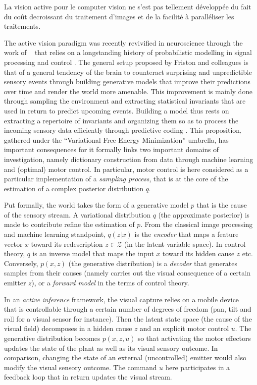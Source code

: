 \documentclass[12pt,twoside,openright]{article}
\begin{document}
	{\color{blue} La vision active pour le computer vision ne s'est pas tellement développée du fait du coût decroissant du traitement d'images et de la facilité à paralléliser les traitements.}

	The active vision paradigm was recently revivified in neuroscience through the work of ~\cite{friston2012perceptions} that relies on a longstanding history of probabilistic modelling in signal processing and control \cite{Kalman1960,Baum1966,friston1994statistical}. 
	The general setup proposed by Friston and colleagues is that of a general tendency of the brain to counteract surprising and unpredictible sensory events through building generative models that improve their predictions over time and render the world more amenable. This improvement is mainly done through sampling the environment and extracting statistical invariants that are used in return to predict upcoming events.
	Building a model thus rests on extracting a repertoire of invariants and organizing them so as to process the incoming sensory data efficiently through predictive coding \cite{rao1999predictive}. This proposition, gathered under the ``Variational Free Energy Minimization'' umbrella, has important consequences for it formally links two important domains of investigation, namely dictionary construction from data through machine learning and (optimal) motor control.
	In particular, motor control is here considered as a particular implementation of a \emph{sampling process}, that is at the core of the estimation of a complex posterior distribution $q$. 
	
	Put formally, the world  takes the form of a generative model $p$ that is the cause of the sensory stream. A variational distribution $q$ (the approximate posterior) is made to contribute refine the estimation of $p$. From the classical image processing and machine learning standpoint, $q(z|x)$ is the \emph{encoder} that maps a feature vector $x$ toward its redescription $z \in \mathcal{Z}$ (in the latent variable space). In control theory, $q$ is an inverse model that maps the input $x$ toward its hidden cause $z$ etc. Conversely, $p(x,z)$ (the generative distribution) is a \emph{decoder} that generates samples from their causes (namely carries out the visual consequence of a certain emitter $z$), or a \emph{forward model} in the terms of control theory.
	
	In an \emph{active inference} framework, the visual capture relies on a mobile device that is controllable through a certain number of degrees of freedom (pan, tilt and roll for a visual sensor for instance).
	Then the latent state space (the cause of the visual field) decomposes in a hidden cause $z$ and an explicit motor control $u$. The generative distribution becomes $p(x, z, u)$ so that activating the motor effectors updates the state of the plant as well as its visual sensory outcome. In comparison,  changing the state of an external (uncontrolled) emitter would also modify the visual sensory outcome. The command $u$ here participates in a feedback loop that in return updates the visual stream.
	
\end{document}
